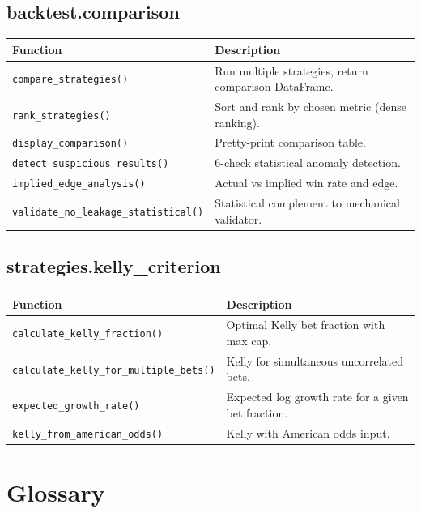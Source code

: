 \documentclass[12pt,a4paper]{report}
\theoremstyle{definition}
\newcommand{\func}[1]{\texttt{#1()}}
\begin{document}
\section{backtest.comparison}

\begin{longtable}{lp{9cm}}
\toprule
\textbf{Function} & \textbf{Description} \\
\midrule
\endhead
\func{compare\_strategies} & Run multiple strategies, return comparison DataFrame. \\
\func{rank\_strategies} & Sort and rank by chosen metric (dense ranking). \\
\func{display\_comparison} & Pretty-print comparison table. \\
\func{detect\_suspicious\_results} & 6-check statistical anomaly detection. \\
\func{implied\_edge\_analysis} & Actual vs implied win rate and edge. \\
\func{validate\_no\_leakage\_statistical} & Statistical complement to mechanical validator. \\
\bottomrule
\end{longtable}

\section{strategies.kelly\_criterion}

\begin{longtable}{lp{9cm}}
\toprule
\textbf{Function} & \textbf{Description} \\
\midrule
\endhead
\func{calculate\_kelly\_fraction} & Optimal Kelly bet fraction with max cap. \\
\func{calculate\_kelly\_for\_multiple\_bets} & Kelly for simultaneous uncorrelated bets. \\
\func{expected\_growth\_rate} & Expected log growth rate for a given bet fraction. \\
\func{kelly\_from\_american\_odds} & Kelly with American odds input. \\
\bottomrule
\end{longtable}


\chapter{Glossary}
\label{ch:glossary}
\end{document}
